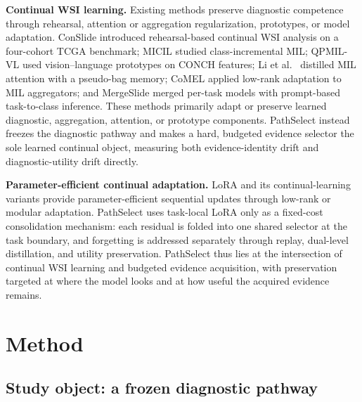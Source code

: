 \documentclass{article}
\begin{document}
\textbf{Continual WSI learning.}
Existing methods preserve diagnostic competence through rehearsal, attention or aggregation regularization, prototypes, or model adaptation. ConSlide \cite{huang2023conslide} introduced rehearsal-based continual WSI analysis on a four-cohort TCGA benchmark; MICIL \cite{meseguer2024micil} studied class-incremental MIL; QPMIL-VL \cite{gou2025qpmil} used vision--language prototypes on CONCH features; Li et al.\ \cite{li2025akd} distilled MIL attention with a pseudo-bag memory; CoMEL \cite{lee2025comel} applied low-rank adaptation to MIL aggregators; and MergeSlide \cite{bui2026mergeslide} merged per-task models with prompt-based task-to-class inference. These methods primarily adapt or preserve learned diagnostic, aggregation, attention, or prototype components. PathSelect instead freezes the diagnostic pathway and makes a hard, budgeted evidence selector the sole learned continual object, measuring both evidence-identity drift and diagnostic-utility drift directly.

\textbf{Parameter-efficient continual adaptation.}
LoRA \cite{hu2022lora} and its continual-learning variants \cite{liang2024inflora,wu2025sdlora,he2025cllora,chen2026flexem} provide parameter-efficient sequential updates through low-rank or modular adaptation. PathSelect uses task-local LoRA only as a fixed-cost consolidation mechanism: each residual is folded into one shared selector at the task boundary, and forgetting is addressed separately through replay, dual-level distillation, and utility preservation. PathSelect thus lies at the intersection of continual WSI learning and budgeted evidence acquisition, with preservation targeted at where the model looks and at how useful the acquired evidence remains.

\section{Method}
\label{sec:method}

\subsection{Study object: a frozen diagnostic pathway}
\label{ssec:setup}
\end{document}
